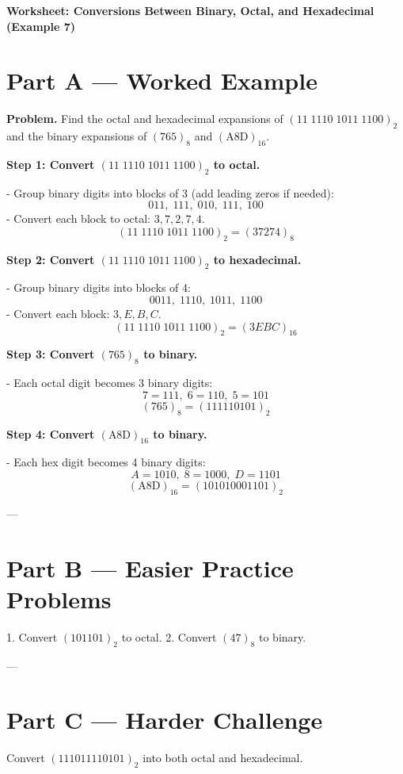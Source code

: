 \documentclass[12pt]{article}
\begin{document}
\begin{center}
\Large\textbf{Worksheet: Conversions Between Binary, Octal, and Hexadecimal (Example 7)}
\end{center}

\section*{Part A — Worked Example}

\textbf{Problem.} Find the octal and hexadecimal expansions of $(11\;1110\;1011\;1100)_{2}$ and the binary expansions of $(765)_{8}$ and $(\text{A8D})_{16}$.

\medskip
\textbf{Step 1: Convert $(11\;1110\;1011\;1100)_{2}$ to octal.}

- Group binary digits into blocks of 3 (add leading zeros if needed):  
\[
011,\;111,\;010,\;111,\;100
\]  
- Convert each block to octal: $3, 7, 2, 7, 4$.  
\[
(11\;1110\;1011\;1100)_{2} = (37274)_{8}
\]

\medskip
\textbf{Step 2: Convert $(11\;1110\;1011\;1100)_{2}$ to hexadecimal.}

- Group binary digits into blocks of 4:  
\[
0011,\;1110,\;1011,\;1100
\]  
- Convert each block: $3, E, B, C$.  
\[
(11\;1110\;1011\;1100)_{2} = (3EBC)_{16}
\]

\medskip
\textbf{Step 3: Convert $(765)_{8}$ to binary.}

- Each octal digit becomes 3 binary digits:  
\[
7 = 111,\; 6 = 110,\; 5 = 101
\]  
\[
(765)_{8} = (111110101)_{2}
\]

\medskip
\textbf{Step 4: Convert $(\text{A8D})_{16}$ to binary.}

- Each hex digit becomes 4 binary digits:  
\[
A = 1010,\; 8 = 1000,\; D = 1101
\]  
\[
(\text{A8D})_{16} = (101010001101)_{2}
\]


---

\section*{Part B — Easier Practice Problems}

1. Convert $(101101)_{2}$ to octal.  
2. Convert $(47)_{8}$ to binary.  

\vspace{2cm}

---

\section*{Part C — Harder Challenge}

Convert $(111011110101)_{2}$ into both octal and hexadecimal.

\vspace{3cm}
\end{document}
